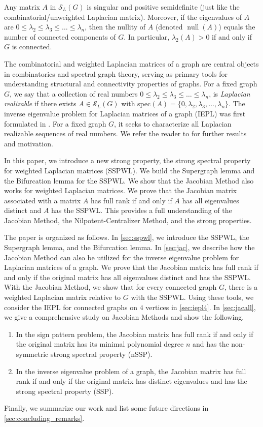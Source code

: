 \documentclass{article}
\theoremstyle{definition}
\newcommand{\nul}{\operatorname{null}}
\newcommand{\mptn}{\mathcal{S}}
\begin{document}
Any matrix $A$ in $\mptn_L(G)$ is singular and positive semidefinite (just like the combinatorial/unweighted Laplacian matrix). Moreover, if the eigenvalues of $A$ are $0 \leq \lambda_2 \leq \lambda_3\leq  \ldots\leq \lambda_n$, then the nullity of $A$ (denoted $\nul(A)$) equals the number of connected components of $G$. In particular, $\lambda_2(A) > 0$ if and only if $G$ is connected.

The combinatorial and weighted Laplacian matrices of a graph are central objects in combinatorics and spectral graph theory, serving as primary tools for understanding structural and connectivity properties of graphs. For a fixed graph $G$, we say that a collection of real numbers $0 \leq \lambda_2 \leq \lambda_3\leq  \ldots\leq \lambda_n$, is \emph{Laplacian realizable} if there exists $A \in \mptn_L(G)$ with spec$(A) = \{0,\lambda_2,\lambda_3,\ldots,\lambda_n\}$. 
The inverse eigenvalue problem for Laplacian matrices of a graph (IEPL) was first formulated in \cite{IEPL}. For a fixed graph $G$, it seeks to characterize all Laplacian realizable sequences of real numbers. We refer the reader to \cite{IEPL} for further results and motivation.

In this paper, we introduce a new strong property, the strong spectral property for weighted Laplacian matrices (SSPWL).  We build the Supergraph lemma and the Bifurcation lemma for the SSPWL.  We show that the Jacobian Method also works for weighted Laplacian matrices.  We prove that the Jacobian matrix associated with a matrix $A$ has full rank if and only if $A$ has all eigenvalues distinct and $A$ has the SSPWL.  This provides a full understanding of the Jacobian Method, the Nilpotent-Centralizer Method, and the strong properties. 


The paper is organized as follows. 
In \cref{sec:sspwl}, we introduce the SSPWL, the Supergraph lemma, and the Bifurcation lemma.  In \cref{sec:jac}, we describe how the Jacobian Method can also be utilized for the inverse eigenvalue problem for Laplacian matrices of a graph.  We prove that the Jacobian matrix has full rank if and only if the original matrix has all eigenvalues distinct and has the SSPWL.  With the Jacobian Method, we show that for every connected graph $G$, there is a weighted Laplacian matrix relative to $G$ with the SSPWL.
Using these tools, we consider the IEPL for connected graphs on $4$ vertices in \cref{sec:iepl4}.
In \cref{sec:jacall}, we give a comprehensive study on Jacobian Methods and show the following.
\begin{enumerate}
\item In the sign pattern problem, the Jacobian matrix has full rank if and only if the original matrix has its minimal polynomial degree $n$ and has the non-symmetric strong spectral property (nSSP).  
\item In the inverse eigenvalue problem of a graph, the Jacobian matrix has full rank if and only if the original matrix has distinct eigenvalues and has the strong spectral property (SSP).  
\end{enumerate}
Finally, we summarize our work and list some future directions in \cref{sec:concluding_remarks}.
\end{document}
